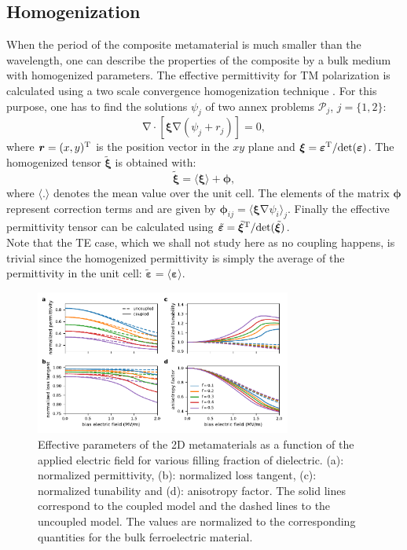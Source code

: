 \documentclass[%
 aip,
 amsmath,amssymb,
 reprint,%
linenumbers
]{revtex4-1}
\newcommand{\B}{\boldsymbol}
\newcommand{\tens}[1]{\B{#1}}
\newcommand{\grad}{\B{\mathrm{\nabla}}}
\renewcommand{\div}{\B{\mathrm{\nabla\cdotp}}}
\newcommand{\epstens}{\tens{\varepsilon}}
\newcommand{\epshom}{\tilde{\epstens}}
\newcommand{\xitens}{\tens{\xi}}
\newcommand{\xihom}{\tilde{\xitens}}
\newcommand{\co}[1]{\textcolor{correction}{#1}}
\begin{document}
\subsection{Homogenization}
\co{When the period of the composite metamaterial is much smaller than the wavelength, one can
describe the properties of the composite by a bulk medium with homogenized parameters.}
The effective permittivity for TM polarization is calculated
using a two scale convergence homogenization technique \cite{allaire_homogenization_1992, guenneau_homogenization_2000}.
For this purpose, one has to find the solutions
$\psi_j$ of two annex problems $\mathcal P_j$, $j=\{1, 2\}$:
\begin{equation}
 \div \left[ \xitens \grad(\psi_j + r_j) \right] = 0,
 \label{eq_hom_annex}
\end{equation}
where $\B r = (x, y)^{\rm T}$ is the position vector in the $xy$ plane and
$\xitens=\epstens^{\rm T}/ {\rm det }(\epstens)$.
The homogenized tensor $\xihom$ is obtained with:
\begin{equation}
 \xihom = \langle \xitens \rangle + \B \phi,
 \label{eq_hom}
\end{equation}
where $\langle . \rangle$ denotes the mean value over the unit cell.
The elements of the matrix $\B \phi$ represent correction terms and
are given by $\B \phi_{ij} = \langle \xitens \grad \psi_i \rangle_j$.
Finally the effective permittivity tensor can be calculated using $\epshom=\xihom^{\rm T}/ {\rm det }(\xihom)$.\\
Note that the TE case, which we shall not study here as no coupling happens, is trivial since
the homogenized permittivity is simply the average of the permittivity in the unit cell:
$\epshom = \langle \epstens \rangle$.







\begin{figure}[!t]
 \centering
 \includegraphics[width=0.75\textwidth]{effective_params_per}
 \caption{Effective parameters of the 2D metamaterials as a function of the
  applied electric field for various filling fraction of dielectric.
  (a): normalized permittivity, (b): normalized loss tangent, (c): normalized tunability and
  (d): anisotropy factor. The solid lines correspond to the coupled model and
  the dashed lines to the uncoupled model. \co{The values are normalized to the corresponding quantities for the bulk ferroelectric material.}}
 \label{eff_par_2D_TM}
\end{figure}
\end{document}
